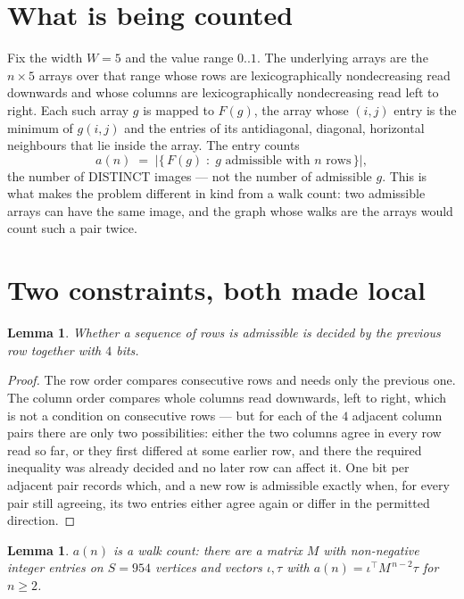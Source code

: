 \documentclass[11pt,a4paper]{article}
\theoremstyle{plain}
\newtheorem{lemma}[theorem]{Lemma}
\theoremstyle{definition}
\begin{document}
\section{What is being counted}

Fix the width $W=5$ and the value range $0..1$. The underlying arrays are the
$n\times5$ arrays over that range whose rows are lexicographically nondecreasing read downwards
and whose columns are lexicographically nondecreasing read left to right. Each such array $g$
is mapped to $F(g)$, the array whose $(i,j)$ entry is the minimum of $g(i,j)$ and the entries
of its antidiagonal, diagonal, horizontal neighbours that lie inside the array. The entry counts
\[
a(n)\;=\;\bigl|\{\,F(g)\;:\;g\text{ admissible with }n\text{ rows}\,\}\bigr|,
\]
the number of DISTINCT images --- not the number of admissible $g$. This is what makes the
problem different in kind from a walk count: two admissible arrays can have the same image, and
the graph whose walks are the arrays would count such a pair twice.

\section{Two constraints, both made local}

\begin{lemma}\label{lem:local}
Whether a sequence of rows is admissible is decided by the previous row together with
$4$ bits.
\end{lemma}

\begin{proof}
The row order compares consecutive rows and needs only the previous one. The column order
compares whole columns read downwards, left to right, which is not a condition on consecutive
rows --- but for each of the $4$ adjacent column pairs there are only two possibilities:
either the two columns agree in every row read so far, or they first differed at some earlier
row, and there the required inequality was already decided and no later row can affect it. One
bit per adjacent pair records which, and a new row is admissible exactly when, for every pair
still agreeing, its two entries either agree again or differ in the permitted direction.
\end{proof}

\begin{lemma}\label{lem:det}
$a(n)$ is a walk count: there are a matrix $M$ with non-negative integer entries on $S=954$
vertices and vectors $\iota,\tau$ with $a(n)=\iota^{\!\top}M^{\,n-2}\tau$ for $n\ge2$.
\end{lemma}
\end{document}
